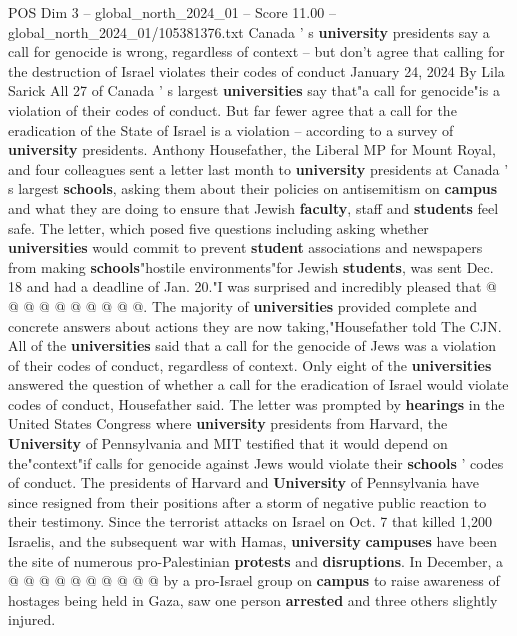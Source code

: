 \begin{textsample}{POS Dim 3 – global\_north\_2024\_01 – Score 11.00 – global\_north\_2024\_01/105381376.txt}  \label{ex:f3_pos_228}
Canada ' s \textbf{university} presidents say a call for genocide is wrong, regardless of context -- but don't agree that calling for the destruction of Israel violates their codes of conduct January 24, 2024 By Lila Sarick All 27 of Canada ' s largest \textbf{universities} say that"a call for genocide"is a violation of their codes of conduct.
But far fewer agree that a call for the eradication of the State of Israel is a violation -- according to a survey of \textbf{university} presidents.
Anthony Housefather, the Liberal MP for Mount Royal, and four colleagues sent a letter last month to \textbf{university} presidents at Canada ' s largest \textbf{schools}, asking them about their policies on antisemitism on \textbf{campus} and what they are doing to ensure that Jewish \textbf{faculty}, staff and \textbf{students} feel safe.
The letter, which posed five questions including asking whether \textbf{universities} would commit to prevent \textbf{student} associations and newspapers from making \textbf{schools}"hostile environments"for Jewish \textbf{students}, was sent Dec. 18 and had a deadline of Jan. 20."I was surprised and incredibly pleased that @ @ @ @ @ @ @ @ @ @.
The majority of \textbf{universities} provided complete and concrete answers about actions they are now taking,"Housefather told The CJN.
All of the \textbf{universities} said that a call for the genocide of Jews was a violation of their codes of conduct, regardless of context.
Only eight of the \textbf{universities} answered the question of whether a call for the eradication of Israel would violate codes of conduct, Housefather said.
The letter was prompted by \textbf{hearings} in the United States Congress where \textbf{university} presidents from Harvard, the \textbf{University} of Pennsylvania and MIT testified that it would depend on the"context"if calls for genocide against Jews would violate their \textbf{schools} ' codes of conduct.
The presidents of Harvard and \textbf{University} of Pennsylvania have since resigned from their positions after a storm of negative public reaction to their testimony.
Since the terrorist attacks on Israel on Oct. 7 that killed 1,200 Israelis, and the subsequent war with Hamas, \textbf{university} \textbf{campuses} have been the site of numerous pro-Palestinian \textbf{protests} and \textbf{disruptions}.
In December, a @ @ @ @ @ @ @ @ @ @ by a pro-Israel group on \textbf{campus} to raise awareness of hostages being held in Gaza, saw one person \textbf{arrested} and three others slightly injured.

\end{textsample}

